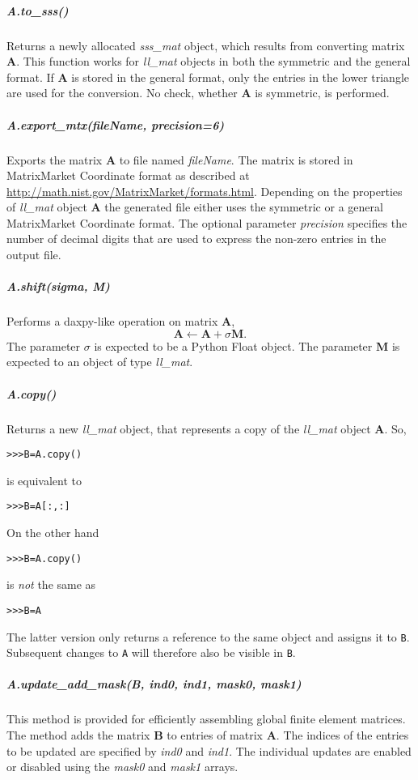 \documentclass[a4paper]{article}
\newcommand{\mat}[1]{\ensuremath{\boldsymbol{#1}}}
\newlength{\pyindent} \newlength{\pyminipagewidth}
\newenvironment{pyinline}{\begin{trivlist}\item\hspace*{\pyindent}\begin{minipage}{\pyminipagewidth}\small\begin{alltt}}
      {\end{alltt}\end{minipage}\end{trivlist}}
\begin{document}
\subparagraph{A.to\_sss()}
%
Returns a newly allocated \textit{sss\_mat} object, which results from
converting matrix $\mat{A}$. This function works for \textit{ll\_mat}
objects in both the symmetric and the general format. If $\mat{A}$ is
stored in the general format, only the entries in the lower triangle
are used for the conversion. No check, whether $\mat{A}$ is symmetric,
is performed.

\subparagraph{A.export\_mtx(fileName, precision=6)}
%
Exports the matrix $\mat{A}$ to file named \textit{fileName}. The
matrix is stored in MatrixMarket Coordinate format as described at
\url{http://math.nist.gov/MatrixMarket/formats.html}. Depending on the
properties of \textit{ll\_mat} object $\mat{A}$ the generated file
either uses the symmetric or a general MatrixMarket Coordinate format.
The optional parameter \textit{precision} specifies the number of
decimal digits that are used to express the non-zero entries in the
output file.

\subparagraph{A.shift(sigma, M)}
%
Performs a daxpy-like operation on matrix $\mat{A}$,
\begin{equation*}
  \mat{A} \leftarrow \mat{A} + \sigma \mat{M}.  
\end{equation*}
The parameter $\sigma$ is expected to be a Python Float object. The
parameter $\mat{M}$ is expected to an object of type \textit{ll\_mat}.

\subparagraph{A.copy()}
%
Returns a new \textit{ll\_mat} object, that represents a copy of the
\textit{ll\_mat} object $\mat{A}$. So,
\begin{pyinline}
>>> B = A.copy()
\end{pyinline}
is equivalent to
\begin{pyinline}
>>> B = A[:,:]
\end{pyinline}
On the other hand
\begin{pyinline}
>>> B = A.copy()
\end{pyinline}
is \emph{not} the same as
\begin{pyinline}
>>> B = A
\end{pyinline}
The latter version only returns a reference to the same object and
assigns it to \texttt{B}. Subsequent changes to \texttt{A} will
therefore also be visible in \texttt{B}.

\subparagraph{A.update\_add\_mask(B, ind0, ind1, mask0, mask1)}
%
This method is provided for efficiently assembling global finite
element matrices. The method adds the matrix $\mat{B}$ to entries of
matrix $\mat{A}$. The indices of the entries to be updated are
specified by \textit{ind0} and \textit{ind1}. The individual updates
are enabled or disabled using the \textit{mask0} and \textit{mask1}
arrays.
\end{document}
